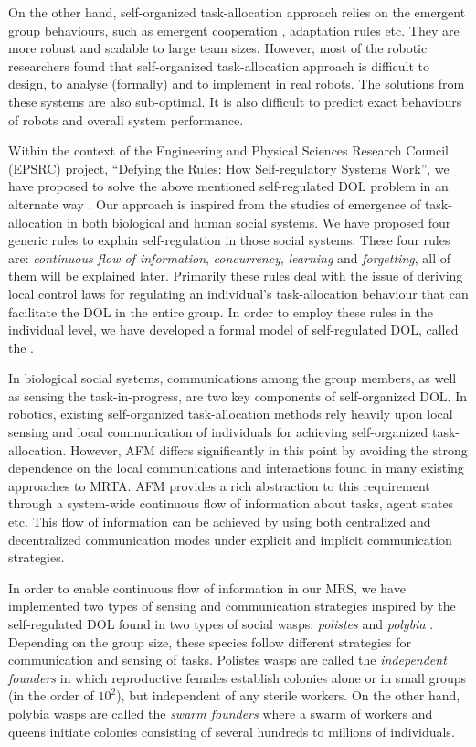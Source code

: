 \documentclass[final,5p,times,twocolumn]{elsarticle}
\begin{document}
On the other hand, self-organized task-allocation approach relies on the emergent group behaviours, such as emergent cooperation \cite{Kube+1993}, adaptation rules \cite{Liu+2007} etc. They are more robust and scalable to large team sizes. However, most of the robotic researchers found that self-organized task-allocation approach is difficult to design, to analyse (formally) and to implement in real robots. The solutions from these systems are also sub-optimal. It is also difficult to predict exact behaviours of robots and overall system performance.

Within the context of the Engineering and Physical Sciences Research Council (EPSRC) project, ``Defying the Rules: How Self-regulatory Systems Work'', we have proposed to solve the above mentioned self-regulated DOL problem in an alternate way \cite{Arcaute+2008}. Our approach is inspired from the studies of emergence of task-allocation in both biological and human social systems. We have proposed four generic rules to explain self-regulation in those social systems. These four rules are: \textit{continuous flow of information}, \textit{concurrency}, \textit{learning} and \textit{forgetting}, all of them will be explained later. Primarily these rules deal with the issue of deriving local control laws for regulating an individual's task-allocation behaviour that can facilitate the DOL in the entire group. In order to  employ these rules in the individual level, we have developed a formal model of self-regulated DOL, called the .

In biological social systems, communications among the group members, as well as sensing the task-in-progress, are two key components of self-organized DOL. In robotics, existing self-organized task-allocation methods rely heavily upon local sensing and local communication of individuals for achieving self-organized task-allocation. However, AFM differs significantly in this point by avoiding the strong dependence on the local communications and interactions found in many existing approaches to MRTA. AFM provides a rich abstraction to this requirement through a system-wide continuous flow of information about tasks, agent states etc. This flow of information can be achieved by using both centralized and decentralized communication modes under explicit and implicit communication strategies.

In order to enable continuous flow of information in our \acl{MRS}, we have implemented two types of sensing and communication strategies inspired by the self-regulated DOL found in two types of social wasps: {\em polistes} and {\em polybia} \cite{Jeanne1999}. Depending on the group size, these species follow different strategies for communication and sensing of tasks. Polistes wasps are called the {\em independent founders} in which reproductive females establish colonies alone or in small groups (in the order of $10^2$), but independent of any sterile workers. On the other hand, polybia wasps are called the {\em swarm founders} where a swarm of workers and queens initiate colonies consisting of several hundreds to millions of individuals.
\end{document}

